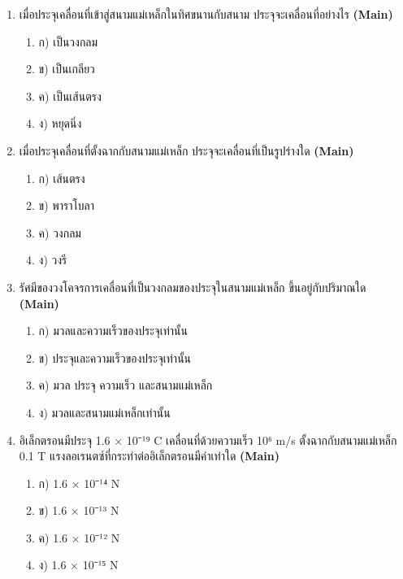 \documentclass[12pt]{article}
\begin{document}
\begin{enumerate}[label=\arabic*.]
\begin{enumerate}[label=)]
\item ก) ไม่ เพราะแรงขึ้นกับขนาดของประจุไม่ใช่ชนิด
\item ข) ใช่ เพราะทิศทางของแรงขึ้นกับชนิดของประจุ
\item ค) ไม่ เพราะแรงลอเรนตซ์เป็นปริมาณสเกลาร์
\item ง) ขึ้นกับทิศทางของสนามแม่เหล็กเท่านั้น
\end{enumerate}
\item เมื่อประจุเคลื่อนที่เข้าสู่สนามแม่เหล็กในทิศขนานกับสนาม ประจุจะเคลื่อนที่อย่างไร \hfill \textbf{\small (Main)}
\begin{enumerate}[label=)]
\item ก) เป็นวงกลม
\item ข) เป็นเกลียว
\item ค) เป็นเส้นตรง
\item ง) หยุดนิ่ง
\end{enumerate}
\item เมื่อประจุเคลื่อนที่ตั้งฉากกับสนามแม่เหล็ก ประจุจะเคลื่อนที่เป็นรูปร่างใด \hfill \textbf{\small (Main)}
\begin{enumerate}[label=)]
\item ก) เส้นตรง
\item ข) พาราโบลา
\item ค) วงกลม
\item ง) วงรี
\end{enumerate}
\item รัศมีของวงโคจรการเคลื่อนที่เป็นวงกลมของประจุในสนามแม่เหล็ก ขึ้นอยู่กับปริมาณใด \hfill \textbf{\small (Main)}
\begin{enumerate}[label=)]
\item ก) มวลและความเร็วของประจุเท่านั้น
\item ข) ประจุและความเร็วของประจุเท่านั้น
\item ค) มวล ประจุ ความเร็ว และสนามแม่เหล็ก
\item ง) มวลและสนามแม่เหล็กเท่านั้น
\end{enumerate}
\item อิเล็กตรอนมีประจุ 1.6 × 10⁻¹⁹ C เคลื่อนที่ด้วยความเร็ว 10⁶ m/s ตั้งฉากกับสนามแม่เหล็ก 0.1 T แรงลอเรนตซ์ที่กระทำต่ออิเล็กตรอนมีค่าเท่าใด \hfill \textbf{\small (Main)}
\begin{enumerate}[label=)]
\item ก) 1.6 × 10⁻¹⁴ N
\item ข) 1.6 × 10⁻¹³ N
\item ค) 1.6 × 10⁻¹² N
\item ง) 1.6 × 10⁻¹⁵ N

\end{enumerate}
\end{enumerate}
\end{document}
